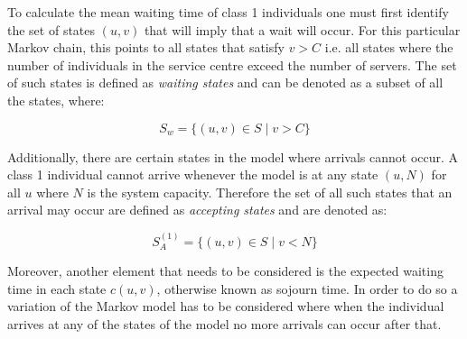 To calculate the mean waiting time of class 1 individuals one must first identify 
the set of states \((u, v)\) that will imply that a wait will occur. 
For this particular Markov chain, this points to all states that satisfy \(v > C\) 
i.e. all states where the number of individuals in the service centre exceed the 
number of servers. 
The set of such states is defined as \textit{waiting states} and can be denoted 
as a subset of all the states, where:

\begin{equation} \label{eq:waiting_states}
    S_w = \{(u, v) \in S \; | \; v > C \}    
\end{equation}

Additionally, there are certain states in the model where arrivals cannot occur. 
A class 1 individual cannot arrive whenever the model is at any state 
\((u, N)\) 
for all \(u\) where \(N\) is the system capacity. 
Therefore the set of all such states that an arrival may occur are defined as 
\textit{accepting states} and are denoted as:

\begin{equation}\label{eq:accepting_states_others}
    S_A^{(1)} = \{(u, v) \in S \; | \; v < N \}
\end{equation}



Moreover, another element that needs to be considered is the expected waiting time 
in each state \( c(u,v) \), otherwise known as sojourn time. 
In order to do so a variation of the Markov model has to be considered where when 
the individual arrives at any of the states of the model no more arrivals can 
occur after that. 


